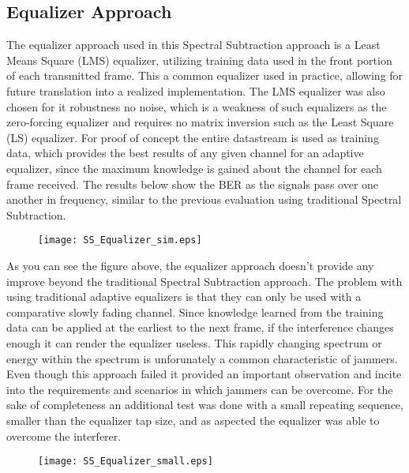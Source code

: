 \subsection{Equalizer Approach}

The equalizer approach used in this Spectral Subtraction approach is a Least Means Square (LMS) equalizer, utilizing training data used in the front portion of each transmitted frame.  This a common equalizer used in practice, allowing for future translation into a realized implementation.  The LMS equalizer was also chosen for it robustness no noise, which is a weakness of such equalizers as the zero-forcing equalizer and requires no matrix inversion such as the Least Square (LS) equalizer.  For proof of concept the entire datastream is used as training data, which provides the best results of any given channel for an adaptive equalizer, since the maximum knowledge is gained about the channel for each frame received.  The results below show the BER as the signals pass over one another in frequency, similar to the previous evaluation using traditional Spectral Subtraction.\\
  
\begin{figure}\label{SS_equalizer}
\texttt{[image: SS\_Equalizer\_sim.eps]}
\end{figure} 

As you can see the figure above, the equalizer approach doesn't provide any improve beyond the traditional Spectral Subtraction approach.  The problem with using traditional adaptive equalizers is that they can only be used with a comparative slowly fading channel.  Since knowledge learned from the training data can be applied at the earliest to the next frame, if the interference changes enough it can render the equalizer useless.  This rapidly changing spectrum or energy within the spectrum is unforunately a common characteristic of jammers.  Even though this approach failed it provided an important observation and incite into the requirements and scenarios in which jammers can be overcome.  For the sake of completeness an additional test was done with a small repeating sequence, smaller than the equalizer tap size, and as aspected the equalizer was able to overcome the interferer.\\

\begin{figure}\label{SS_equalizer_small}
\texttt{[image: SS\_Equalizer\_small.eps]}
\end{figure} 


